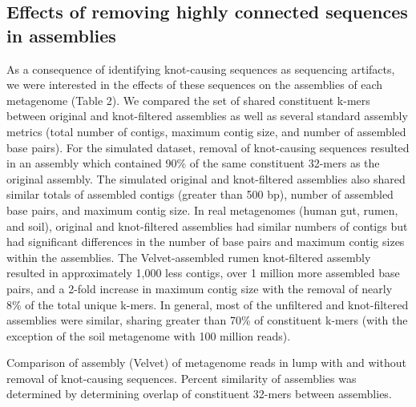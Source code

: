\documentclass[11pt]{article} %
\begin{document}
\subsection{Effects of removing highly connected sequences in assemblies }

As a consequence of identifying knot-causing sequences as sequencing artifacts, we were interested in the effects of these sequences on the assemblies of each metagenome (Table 2).   We compared the set of shared constituent k-mers between original and knot-filtered assemblies as well as several standard assembly metrics (total number of contigs, maximum contig size, and number of assembled base pairs). For the simulated dataset, removal of knot-causing sequences resulted in an assembly which contained 90\% of the same constituent 32-mers as the original assembly.  The simulated original and knot-filtered assemblies also shared similar totals of assembled contigs (greater than 500 bp), number of assembled base pairs, and maximum contig size. In real metagenomes (human gut, rumen, and soil), original and knot-filtered assemblies had similar numbers of contigs but had significant differences in the number of base pairs and maximum contig sizes within the assemblies.  The Velvet-assembled rumen knot-filtered assembly resulted in approximately 1,000 less contigs, over 1 million more assembled base pairs, and a 2-fold increase in maximum contig size with the removal of nearly 8\% of the total unique k-mers.  In general, most of the unfiltered and knot-filtered assemblies were similar, sharing greater than 70\% of constituent k-mers (with the exception of the soil metagenome with 100 million reads).    

\begin{table}
\caption{Comparison of assembly (Velvet) of metagenome reads in lump with and without removal of knot-causing sequences.  Percent similarity of assemblies was determined by determining overlap of constituent 32-mers between assemblies.}
\end{table}
\end{document}
